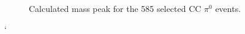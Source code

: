 \documentclass[12pt]{article}
\begin{document}
\begin{figure}[h!]
\centering
{}
\caption{Calculated mass peak for the 585 selected CC $\pi^0$ events. }
\label{fig:mass}
\end{figure}

`






\newpage
\end{document}
